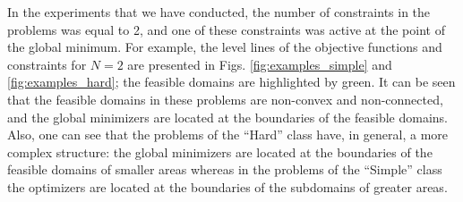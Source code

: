 \documentclass[preprint]{elsarticle}
\begin{document}
	In the experiments that we have conducted, the number of constraints in the problems was equal to 2, and one of these constraints was active at the point of the global minimum. For example, the level lines of the objective functions and constraints for $N=2$ are presented in Figs. \ref{fig:examples_simple} and \ref{fig:examples_hard}; the feasible domains are highlighted by green. It can be seen that the feasible domains in these problems are non-convex and non-connected, and the global minimizers are located at the boundaries of the feasible domains. Also, one can see that the problems of the ``Hard'' class have, in general, a more complex structure: the global minimizers are located at the boundaries of the feasible domains of smaller areas whereas in the problems of the ``Simple'' class the optimizers are located at the boundaries of the subdomains of greater areas.
	
\end{document}
